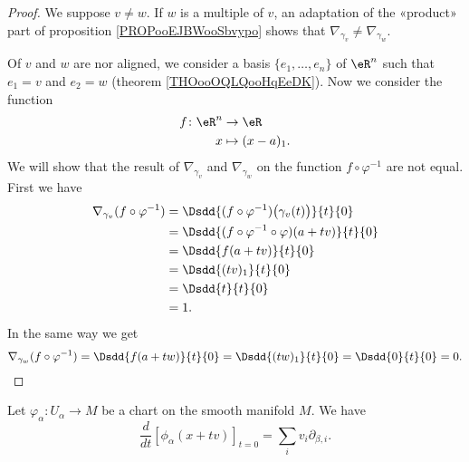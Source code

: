 \begin{proof}
	We suppose \( v\neq w\). If \( w\) is a multiple of \( v\), an adaptation of the «product» part of proposition \ref{PROPooEJBWooSbvypo} shows that \( \nabla_{\gamma_v}\neq \nabla_{\gamma_w}\).

	Of \( v\) and \( w\) are nor aligned, we consider a basis \( \{ e_1,\ldots, e_n \}\) of \( \eR^n\) such that \( e_1=v\) and \( e_2=w\) (theorem \ref{THOooOQLQooHqEeDK}). Now we consider the function
	\begin{equation}
		\begin{aligned}
			f\colon \eR^n & \to \eR          \\
			x             & \mapsto (x-a)_1.
		\end{aligned}
	\end{equation}
	We will show that the result of \( \nabla_{\gamma_v}\) and \( \nabla_{\gamma_w}\) on the function \( f\circ\varphi^{-1}\) are not equal. First we have
	\begin{subequations}
		\begin{align}
			\nabla_{\gamma_v}(f\circ\varphi^{-1}) & =\Dsdd{ (f\circ\varphi^{-1})\big( \gamma_v(t) \big) }{t}{0} \\
			                                      & =\Dsdd{ (f\circ\varphi^{-1}\circ\varphi)(a+tv) }{t}{0}      \\
			                                      & =\Dsdd{ f(a+tv) }{t}{0}                                     \\
			                                      & =\Dsdd{ (tv)_1 }{t}{0}                                      \\
			                                      & =\Dsdd{ t }{t}{0}                                           \\
			                                      & =1.
		\end{align}
	\end{subequations}
	In the same way we get
	\begin{equation}
		\nabla_{\gamma_w}(f\circ\varphi^{-1})=\Dsdd{ f(a+tw) }{t}{0}=\Dsdd{ (tw)_1 }{t}{0}=\Dsdd{ 0 }{t}{0}=0.
	\end{equation}
\end{proof}

\begin{proposition}	\label{PROPooOSCIooFPRtRg}
	Let \(\varphi_{\alpha} \colon U_{\alpha}\to M  \) be a chart on the smooth manifold \( M\). We have
	\begin{equation}
		\frac{d}{dt} \left[ \phi_{\alpha}(x+tv)  \right]_{t=0}=\sum_iv_i\partial_{\beta,i}.
	\end{equation}
\end{proposition}


